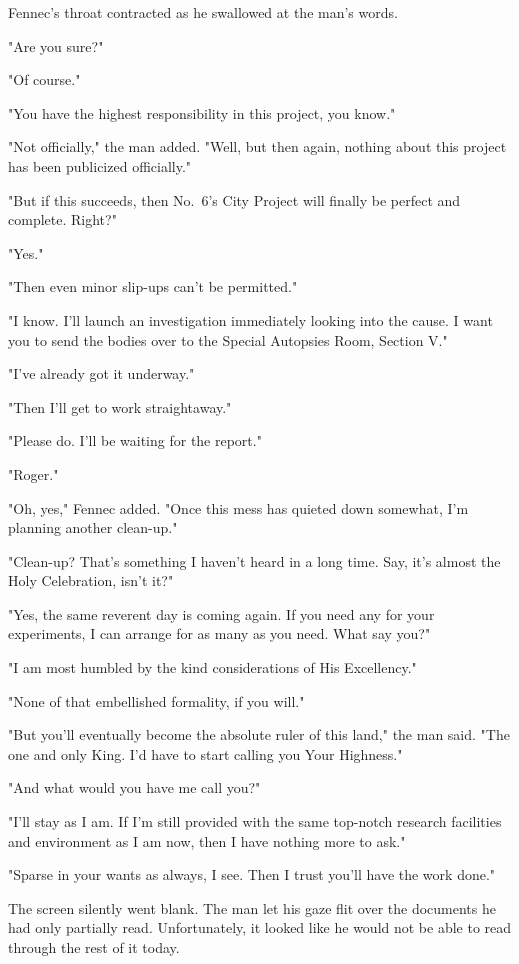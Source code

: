 Fennec's throat contracted as he swallowed at the man's words.

"Are you sure?"

"Of course."

"You have the highest responsibility in this project, you know."

"Not officially," the man added. "Well, but then again, nothing about
this project has been publicized officially."

"But if this succeeds, then No.~6's City Project will finally be perfect
and complete. Right?"

"Yes."

"Then even minor slip-ups can't be permitted."

"I know. I'll launch an investigation immediately looking into the
cause. I want you to send the bodies over to the Special Autopsies Room,
Section V."

"I've already got it underway."

"Then I'll get to work straightaway."

"Please do. I'll be waiting for the report."

"Roger."

"Oh, yes," Fennec added. "Once this mess has quieted down somewhat, I'm
planning another clean-up."

"Clean-up? That's something I haven't heard in a long time. Say, it's
almost the Holy Celebration, isn't it?"

"Yes, the same reverent day is coming again. If you need any for your
experiments, I can arrange for as many as you need. What say you?"

"I am most humbled by the kind considerations of His Excellency."

"None of that embellished formality, if you will."

"But you'll eventually become the absolute ruler of this land," the man
said. "The one and only King. I'd have to start calling you Your
Highness."

"And what would you have me call you?"

"I'll stay as I am. If I'm still provided with the same top-notch
research facilities and environment as I am now, then I have nothing
more to ask."

"Sparse in your wants as always, I see. Then I trust you'll have the
work done."

The screen silently went blank. The man let his gaze flit over the
documents he had only partially read. Unfortunately, it looked like he
would not be able to read through the rest of it today.

